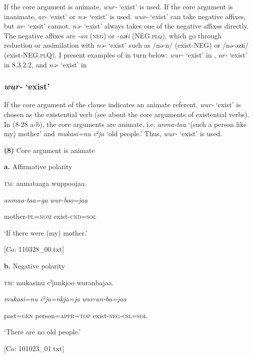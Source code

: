 If the core argument is animate, \textit{wur-} ‘exist’ is used. If the core argument is inanimate, \textit{ar-} ‘exist’ or \textit{nə-} ‘exist’ is used. \textit{wur-} ‘exist’ can take negative affixes, but \textit{ar-} ‘exsit’ cannot. \textit{nə-} ‘exist’ always takes one of the negative affixes directly. The negative affixes are \textit{{}-an} (\textsc{neg}) or \textit{{}-azɨi} (NEG.\textsc{plq}), which go through reduction or assimilation with \textit{nə-} ‘exist’ such as /nə-n/ (exist-NEG) or /nə-əzɨi/ (exist-NEG.\textsc{pl}Q). I present examples of  in turn below: \textit{wur-} ‘exist’ in , \textit{ar-} ‘exist’ in 8.3.2.2, and \textit{nə-} ‘exist’ in 

\subsubsection{\textit{wur-} ‘exist’}

If the core argument of the clause indicates an animate referent, \textit{wur-} ‘exist’ is chosen as the existential verb (see  about the core arguments of existential verbs). In (8-28 a-b), the core arguments are animate, i.e. \textit{anma-taa} ‘(such a person like my) mother’ and \textit{mukasi=nu} \textit{cˀju} ‘old people.’ Thus, \textit{wur-} ‘exist’ is used.

\textbf{(8)}  Core argument is animate

  \textbf{a.}  Affirmative polarity

    \textsc{tm}:  anmataaga  wuppoojaa.

      \textit{anmaa-taa=ga}  \textit{wur{}-boo=jaa}

      mother-\textsc{pl}=\textsc{nom}  exist-\textsc{cnd}=\textsc{sol}

      ‘If there were (my) mother.’

      [Co: 110328\_00.txt]

  \textbf{b.}  Negative polarity

    \textsc{tm}:  mukasinu  cˀjunkjoo  wuranbajaa.

      \textit{mukasi=nu}  \textit{cˀju=nkja=ja}  \textit{wur{}-an-ba=jaa}

      past=\textsc{gen}  person=\textsc{appr}=\textsc{top}  exist-\textsc{neg}-\textsc{csl}=\textsc{sol}

      ‘There are no old people.’

      [Co: 101023\_01.txt]

